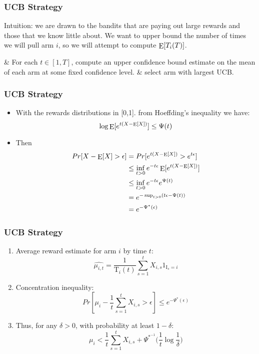 \documentclass{beamer}
\DeclareMathOperator*{\E}{\rm E}
\newcommand{\mI}{{\mathrm I}}
\newcommand{\mT}{{\mathrm T}}
\begin{document}
   \begin{frame}[fragile]   
     \frametitle{UCB Strategy}
	 Intuition: we are drawn to the bandits that are paying out large rewards and those that we know little about. 
	 We want to upper bound the number of times we will pull arm $i$, so we will attempt to compute $\E [ T_i(T) ] $.
	 
	\begin{easylist}[itemize]
		& For each $t \in [1,T]$, compute an upper confidence bound estimate on the mean of each arm at some fixed confidence level.
		& select arm with largest UCB.
	\end{easylist}

   \end{frame}
 
   \begin{frame}
        \frametitle{UCB Strategy}

      	\begin{itemize}
		\item With the rewards distributions in [0,1]. from Hoeffding's inequality we have: 
		\[
			\log \E[ e^{t (X-\E[X]) } ] \le \Psi(t)
		\]
		\item Then
			\begin{align*}
				Pr[X - \E[X] > \epsilon] 	&= Pr[ e^{t (X-\E[X]) } > e^{t \epsilon} ] \\
									&\le \inf_{t>0}  e^{-t \epsilon} \E[e^{t (X-\E[X]) }] \\
									&\le \inf_{t>0} e^{-t \epsilon} e^{\Psi(t)} \\
									&= e^{-\sup_{t>0} (t \epsilon-\Psi(t))} \\
									&= e^{-\Psi^{*}(\epsilon)}
			\end{align*}
   	\end{itemize}
   \end{frame}

   \begin{frame}
        \frametitle{UCB Strategy}

      	\begin{enumerate}
		\item Average reward estimate for arm $i$ by time $t$:
				$$\widehat{\mu_{i,t}} = \frac{1}{\mT_i (t) } \sum_{s=1}^t X_{i,s} 1_{\mI_s=i} $$
		\item Concentration inequality:
				$$Pr[ \mu_i - \frac{1}{t} \sum_{s=1}^t X_{i,s} > \epsilon ] \le e^{-\Psi^{*}(\epsilon)} $$
		\item Thus, for any $\delta > 0$, with probability at least $1-\delta$:
				$$ \mu_i <  \frac{1}{t} \sum_{s=1}^t X_{i,s} + \Psi^{*^{-1}}  \big( \frac{1}{t}  \log{\frac{1}{\delta} } \big)$$
   	\end{enumerate}

   \end{frame}
\end{document}
